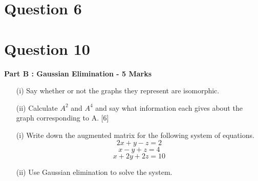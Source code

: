 \documentclass[]{report}
\begin{document}

\newpage
\section*{Question 6}







\newpage
\section*{Question 10}
%


\noindent \textbf{Part B : Gaussian Elimination - 5 Marks}\\ 
\begin{itemize}
\item[(i)] Say whether or not the graphs they represent are isomorphic.
\item[(ii)] Calculate $A^2$ and $A^4$ and say what information each gives about the graph
corresponding to A. [6]
\end{itemize}
\begin{itemize}
\item[(i)] Write down the augmented matrix for the following system of equations.
\[2x + y - z = 2\]
\[x - y + z = 4\]
\[x + 2y + 2z = 10\]
\item[(ii)] Use Gaussian elimination to solve the system. 
\end{itemize}


\newpage
\end{document}
